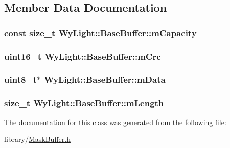 \subsection{Member Data Documentation}
\hypertarget{class_wy_light_1_1_base_buffer_a536a7f475b68dee906028913cab8799a}{
\subsubsection[{m\-Capacity}]{\setlength{\rightskip}{0pt plus 5cm}const size\-\_\-t Wy\-Light\-::\-Base\-Buffer\-::m\-Capacity\hspace{0.3cm}{\ttfamily [protected]}}}\label{class_wy_light_1_1_base_buffer_a536a7f475b68dee906028913cab8799a}
\hypertarget{class_wy_light_1_1_base_buffer_a084b781e48f372fc9d72ef95a7435d7a}{
\subsubsection[{m\-Crc}]{\setlength{\rightskip}{0pt plus 5cm}uint16\-\_\-t Wy\-Light\-::\-Base\-Buffer\-::m\-Crc\hspace{0.3cm}{\ttfamily [protected]}}}\label{class_wy_light_1_1_base_buffer_a084b781e48f372fc9d72ef95a7435d7a}
\hypertarget{class_wy_light_1_1_base_buffer_a724a04148d90146319fc11894d2ebd6e}{
\subsubsection[{m\-Data}]{\setlength{\rightskip}{0pt plus 5cm}uint8\-\_\-t$\ast$ Wy\-Light\-::\-Base\-Buffer\-::m\-Data\hspace{0.3cm}{\ttfamily [protected]}}}\label{class_wy_light_1_1_base_buffer_a724a04148d90146319fc11894d2ebd6e}
\hypertarget{class_wy_light_1_1_base_buffer_ab36dd430b1e190e54ce338d3b98c1cbd}{
\subsubsection[{m\-Length}]{\setlength{\rightskip}{0pt plus 5cm}size\-\_\-t Wy\-Light\-::\-Base\-Buffer\-::m\-Length\hspace{0.3cm}{\ttfamily [protected]}}}\label{class_wy_light_1_1_base_buffer_ab36dd430b1e190e54ce338d3b98c1cbd}


The documentation for this class was generated from the following file\-:\begin{DoxyCompactItemize}
\item 
library/\hyperlink{_mask_buffer_8h}{Mask\-Buffer.\-h}\end{DoxyCompactItemize}
